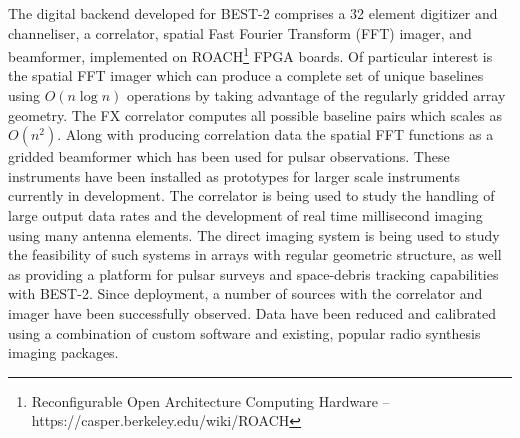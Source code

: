 \documentclass[useAMS,macros,usenatbib]{mn2e}
\begin{document}
The digital backend developed for BEST-2 comprises a 32 element digitizer and channeliser, a correlator, spatial Fast Fourier Transform (FFT) imager, and beamformer, implemented on ROACH\footnote{Reconfigurable Open Architecture Computing Hardware -- https://casper.berkeley.edu/wiki/ROACH} FPGA boards.
Of particular interest is the spatial FFT imager which can produce a complete set of unique baselines using $O(n \log n)$ operations by taking advantage of the regularly gridded array geometry.
The FX correlator computes all possible baseline pairs which scales as $O(n^2)$.
Along with producing correlation data the spatial FFT functions as a gridded beamformer which has been used for pulsar observations.
These instruments have been installed as prototypes for larger scale instruments currently in development.
The correlator is being used to study the handling of large output data rates and the development of real time millisecond imaging using many antenna elements.
The direct imaging system is being used to study the feasibility of such systems in arrays with regular geometric structure, as well as providing a platform for pulsar surveys and space-debris tracking capabilities with BEST-2.
Since deployment, a number of sources with the correlator and imager have been successfully observed.
Data have been reduced and calibrated using a combination of custom software and existing, popular radio synthesis imaging packages.
\end{document}
